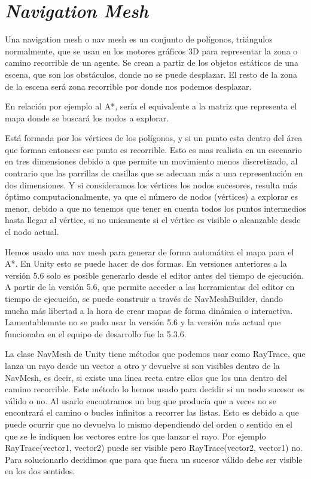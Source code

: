 
\section{\textit{Navigation Mesh}}
Una navigation mesh o nav mesh es un conjunto de polígonos, triángulos normalmente, que se usan en los motores gráficos 3D para representar la zona o camino recorrible de un agente. Se crean a partir de los objetos estáticos de una escena, que son los obstáculos, donde no se puede desplazar. El resto de la zona de la escena será zona recorrible por donde nos podemos desplazar.

En relación por ejemplo al A*, sería el equivalente a la matriz que representa el mapa donde se buscará los nodos a explorar.

Está formada por los vértices de los polígonos, y si un punto esta dentro del área que forman entonces ese punto es recorrible. Esto es mas realista en un escenario en tres dimensiones debido a que permite un movimiento menos discretizado, al contrario que las parrillas de casillas que se adecuan más a una representación en dos dimensiones. Y si consideramos los vértices los nodos sucesores, resulta más óptimo computacionalmente, ya que el número de nodos (vértices) a explorar es menor, debido a que no tenemos que tener en cuenta todos los puntos intermedios hasta llegar al vértice, si no unicamente si el vértice es visible o alcanzable desde el nodo actual.

Hemos usado una nav mesh para generar de forma automática el mapa para el A*. En Unity esto se puede hacer de dos formas. En versiones anteriores a la versión 5.6 solo es posible generarlo desde el editor antes del tiempo de ejecución. A partir de la versión 5.6, que permite acceder a las herramientas del editor en tiempo de ejecución, se puede construir a través de NavMeshBuilder, dando mucha más libertad a la hora de crear mapas de forma dinámica o interactiva. Lamentablemnte no se pudo usar la versión 5.6 y la versión más actual que funcionaba en el equipo de desarrollo fue la 5.3.6.

La clase NavMesh de Unity tiene métodos que podemos usar como RayTrace, que lanza un rayo desde un vector a otro y devuelve si son visibles dentro de la NavMesh, es decir, si existe una línea recta entre ellos que los una dentro del camino recorrible. Este método lo hemos usado para decidir si un nodo sucesor es válido o no. Al usarlo encontramos un bug que producía que a veces no se encontrará el camino o bucles infinitos a recorrer las listas. Esto es debido a que puede ocurrir que no devuelva lo mismo dependiendo del orden o sentido en el que se le indiquen los vectores entre los que lanzar el rayo. Por ejemplo RayTrace(vector1, vector2) puede ser visible pero RayTrace(vector2, vector1) no. Para solucionarlo decidimos que para que fuera un sucesor válido debe ser visible en los dos sentidos.
